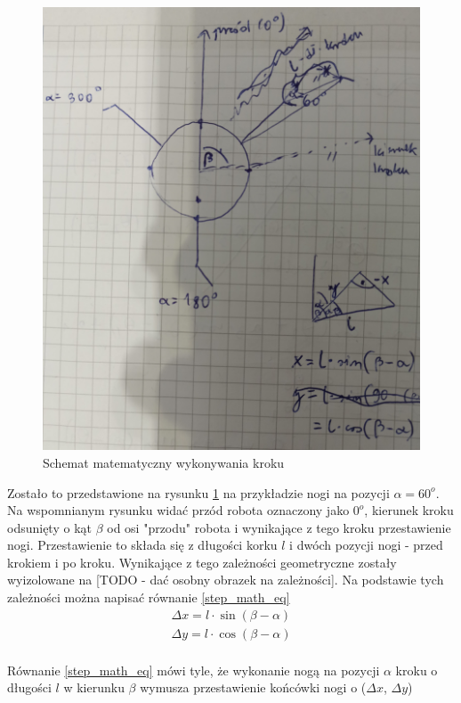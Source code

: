 \begin{figure}[h!]
\includegraphics[width=\textwidth]{img/step_math.jpg}
\caption{Schemat matematyczny wykonywania kroku}
\label{step_math}
\end{figure}

Zostało to przedstawione na rysunku \ref{step_math} na przykładzie nogi na pozycji $\alpha = 60^o$. Na wspomnianym rysunku widać przód robota oznaczony jako $0^o$, kierunek kroku odsunięty o kąt $\beta$ od osi "przodu" robota i wynikające z tego kroku przestawienie nogi. Przestawienie to składa się z długości korku $l$ i dwóch pozycji nogi - przed krokiem i po kroku. Wynikające z tego zależności geometryczne zostały wyizolowane na [TODO - dać osobny obrazek na zależności]. Na podstawie tych zależności można napisać równanie \ref{step_math_eq}
\begin{equation} \label{step_math_eq}
\begin{split}
\Delta x = l \cdot \sin(\beta - \alpha)\\
\Delta y = l \cdot \cos(\beta - \alpha)\\
\end{split}
\end{equation}

Równanie \ref{step_math_eq} mówi tyle, że wykonanie nogą na pozycji $\alpha$ kroku o długości $l$ w kierunku $\beta$ wymusza przestawienie końcówki nogi o ($\Delta x$, $\Delta y$)


